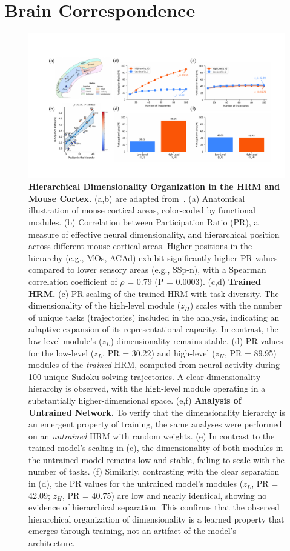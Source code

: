 \section{Brain Correspondence}
\label{sec:brain_correspondence}


\begin{figure}[htbp]
\centering
\includegraphics[width=0.95\linewidth]{figures/analysis/hierarchical_dimensionality.pdf}
\caption{
    \textbf{Hierarchical Dimensionality Organization in the HRM and Mouse Cortex.}
    (a,b) are adapted from~\citet{posani2025rarely}.
    (a) Anatomical illustration of mouse cortical areas, color-coded by functional modules.
    (b) Correlation between Participation Ratio (PR), a measure of effective neural dimensionality, and hierarchical position across different mouse cortical areas. Higher positions in the hierarchy (e.g., MOs, ACAd) exhibit significantly higher PR values compared to lower sensory areas (e.g., SSp-n), with a Spearman correlation coefficient of $\rho$ = 0.79 (P = 0.0003).
    (c,d) \textbf{Trained HRM.}
    (c) PR scaling of the trained HRM with task diversity. The dimensionality of the high-level module ($z_H$) scales with the number of unique tasks (trajectories) included in the analysis, indicating an adaptive expansion of its representational capacity. In contrast, the low-level module's ($z_L$) dimensionality remains stable.
    (d) PR values for the low-level ($z_L$, PR = 30.22) and high-level ($z_H$, PR = 89.95) modules of the \emph{trained} HRM, computed from neural activity during 100 unique Sudoku-solving trajectories. A clear dimensionality hierarchy is observed, with the high-level module operating in a substantially higher-dimensional space.
    (e,f) \textbf{Analysis of Untrained Network.} To verify that the dimensionality hierarchy is an emergent property of training, the same analyses were performed on an \emph{untrained} HRM with random weights.
    (e) In contrast to the trained model's scaling in (c), the dimensionality of both modules in the untrained model remains low and stable, failing to scale with the number of tasks.
    (f) Similarly, contrasting with the clear separation in (d), the PR values for the untrained model's modules ($z_L$, PR = 42.09; $z_H$, PR = 40.75) are low and nearly identical, showing no evidence of hierarchical separation. This confirms that the observed hierarchical organization of dimensionality is a learned property that emerges through training, not an artifact of the model's architecture.
}
\label{fig:hierarchical_dimensionality}
\end{figure}

